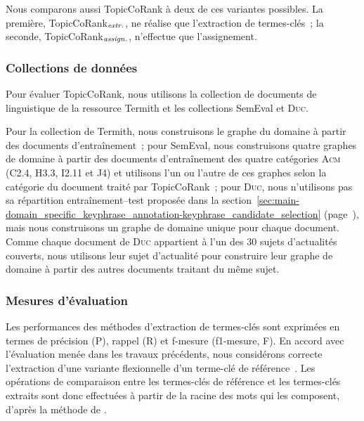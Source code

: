         Nous comparons aussi TopicCoRank à deux de ces variantes possibles. La
        première, TopicCoRank$_\textnormal{\textit{extr.}}$, ne réalise que
        l'extraction de termes-clés~; la seconde,
        TopicCoRank$_\textnormal{\textit{assign.}}$, n'effectue que
        l'assignement.

      \subsubsection{Collections de données}
      \label{subsubsec:main-domain_specific_keyphrase_annotation-supervised_automatic_keyphrase_annotation-evaluation-evaluation_data}
        Pour évaluer TopicCoRank, nous utilisons la collection de documents de
        linguistique de la ressource Termith et les collections SemEval et
        \textsc{Duc}.
        
        Pour la collection de Termith, nous construisons le graphe du domaine à
        partir des documents d'entraînement~; pour SemEval, nous construisons
        quatre graphes de domaine à partir des documents d'entraînement des
        quatre catégories \textsc{Acm} (C2.4, H3.3, I2.11 et J4) et utilisons
        l'un ou l'autre de ces graphes selon la catégorie du document traité par
        TopicCoRank~; pour \textsc{Duc}, nous n'utilisons pas sa répartition
        entraînement--test proposée dans la
        section~\ref{sec:main-domain_specific_keyphrase_annotation-keyphrase_candidate_selection}
        (page~\pageref{sec:main-domain_specific_keyphrase_annotation-keyphrase_candidate_selection}),
        mais nous construisons un graphe de domaine unique pour chaque document.
        Comme chaque document de \textsc{Duc} appartient à l'un des 30 sujets
        d'actualités couverts, nous utilisons leur sujet d'actualité pour
        construire leur graphe de domaine à partir des autres documents traitant
        du même sujet.
      
      \subsubsection{Mesures d'évaluation}
      \label{subsubsec:main-domain_specific_keyphrase_annotation-supervised_automatic_keyphrase_annotation-evaluation-evaluation_measures}
        Les performances des méthodes d'extraction de termes-clés sont exprimées
        en termes de précision (P), rappel (R) et f-mesure (f1-mesure, F). En
        accord avec l'évaluation menée dans les travaux précédents, nous
        considérons correcte l'extraction d'une variante flexionnelle d'un
        terme-clé de référence~\cite{kim2010semeval}. Les opérations de
        comparaison entre les termes-clés de référence et les termes-clés
        extraits sont donc effectuées à partir de la racine des mots qui les
        composent, d'après la méthode de .

